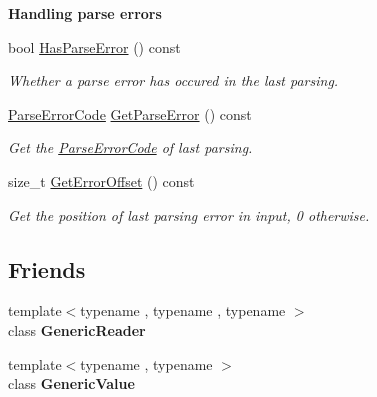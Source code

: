 \begin{Indent}{\bf Handling parse errors}\par
\begin{DoxyCompactItemize}
\item 
\hypertarget{class_generic_document_afe0c87d9fc13a78597360e0646479419}{}bool \hyperlink{class_generic_document_afe0c87d9fc13a78597360e0646479419}{Has\+Parse\+Error} () const \label{class_generic_document_afe0c87d9fc13a78597360e0646479419}

\begin{DoxyCompactList}\small\item\em Whether a parse error has occured in the last parsing. \end{DoxyCompactList}\item 
\hypertarget{class_generic_document_aab4771355aa3c6e5368da3ae36f38cc1}{}\hyperlink{group___r_a_p_i_d_j_s_o_n___e_r_r_o_r_s_ga8d4b32dfc45840bca189ade2bbcb6ba7}{Parse\+Error\+Code} \hyperlink{class_generic_document_aab4771355aa3c6e5368da3ae36f38cc1}{Get\+Parse\+Error} () const \label{class_generic_document_aab4771355aa3c6e5368da3ae36f38cc1}

\begin{DoxyCompactList}\small\item\em Get the \hyperlink{group___r_a_p_i_d_j_s_o_n___e_r_r_o_r_s_ga8d4b32dfc45840bca189ade2bbcb6ba7}{Parse\+Error\+Code} of last parsing. \end{DoxyCompactList}\item 
\hypertarget{class_generic_document_a2db6ad11d157342f725470fb898b6712}{}size\+\_\+t \hyperlink{class_generic_document_a2db6ad11d157342f725470fb898b6712}{Get\+Error\+Offset} () const \label{class_generic_document_a2db6ad11d157342f725470fb898b6712}

\begin{DoxyCompactList}\small\item\em Get the position of last parsing error in input, 0 otherwise. \end{DoxyCompactList}\end{DoxyCompactItemize}
\end{Indent}
\subsection*{Friends}
\begin{DoxyCompactItemize}
\item 
\hypertarget{class_generic_document_a22b985b0f7f78ef254a566655ee0550f}{}{\footnotesize template$<$typename , typename , typename $>$ }\\class {\bfseries Generic\+Reader}\label{class_generic_document_a22b985b0f7f78ef254a566655ee0550f}

\item 
\hypertarget{class_generic_document_a899449e1a645b5e377af059fb61113d8}{}{\footnotesize template$<$typename , typename $>$ }\\class {\bfseries Generic\+Value}\label{class_generic_document_a899449e1a645b5e377af059fb61113d8}

\end{DoxyCompactItemize}
